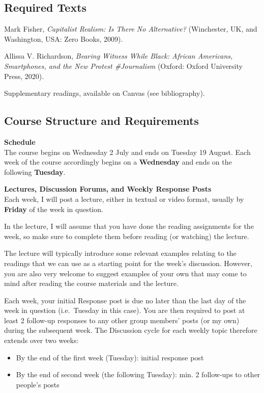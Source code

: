 \documentclass[
  letterpaper,
  DIV=11,
  numbers=noendperiod]{scrartcl}
\providecommand{\tightlist}{%
  \setlength{\itemsep}{0pt}\setlength{\parskip}{0pt}}
\begin{document}
\subsection{Required Texts}\label{required-texts}

Mark Fisher, \emph{Capitalist Realism: Is There No Alternative?}
(Winchester, UK, and Washington, USA: Zero Books, 2009).

Allissa V. Richardson, \emph{Bearing Witness While Black: African
Americans, Smartphones, and the New Protest \#Journalism} (Oxford:
Oxford University Press, 2020).

Supplementary readings, available on Canvas (see bibliography).

\subsection{Course Structure and
Requirements}\label{course-structure-and-requirements}

\textbf{Schedule}\\
The course begins on Wednesday 2 July and ends on Tuesday 19 August.
Each week of the course accordingly begins on a \textbf{Wednesday} and
ends on the following \textbf{Tuesday}.

\textbf{Lectures, Discussion Forums, and Weekly Response Posts}\\
Each week, I will post a lecture, either in textual or video format,
usually by \textbf{Friday} of the week in question.

In the lecture, I will assume that you have done the reading assignments
for the week, so make sure to complete them before reading (or watching)
the lecture.

The lecture will typically introduce some relevant examples relating to
the readings that we can use as a starting point for the week's
discussion. However, you are also very welcome to suggest examples of
your own that may come to mind after reading the course materials and
the lecture.

Each week, your initial Response post is due no later than the last day
of the week in question (i.e.~Tuesday in this case). You are then
required to post at least 2 follow-up responses to any other group
members' posts (or my own) during the subsequent week. The Discussion
cycle for each weekly topic therefore extends over two weeks:

\begin{itemize}
\tightlist
\item
  By the end of the first week (Tuesday): initial response post
\item
  By the end of second week (the following Tuesday): min. 2 follow-ups
  to other people's posts
\end{itemize}
\end{document}
